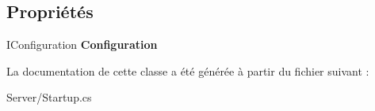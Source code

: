 \subsection*{Propriétés}
\begin{DoxyCompactItemize}
\item 
\mbox{\label{class_mediwatch_website_1_1_server_1_1_startup_a5ff542e1011c165e6eb0035814d6f0ff}} 
I\+Configuration {\bfseries Configuration}
\end{DoxyCompactItemize}


La documentation de cette classe a été générée à partir du fichier suivant \+:\begin{DoxyCompactItemize}
\item 
Server/Startup.\+cs\end{DoxyCompactItemize}
